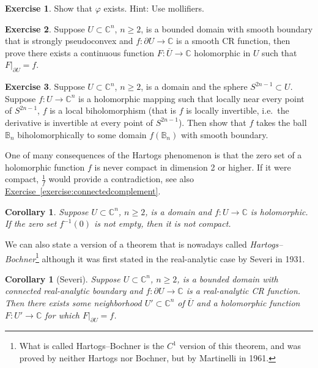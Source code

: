 \documentclass[12pt,openany]{book}
\newcommand{\C}{{\mathbb{C}}}
\newcommand{\bB}{{\mathbb{B}}}
\newcommand{\myindex}[1]{#1\index{#1}}
\theoremstyle{plain}
\newtheorem{cor}[thm]{Corollary}
\theoremstyle{remark}
\theoremstyle{definition}
\newenvironment{exbox}{%
    \def\FrameCommand{\vrule width 1pt \relax\hspace {10pt}}%
    \MakeFramed {\advance \hsize -\width \FrameRestore }%
}{%
    \endMakeFramed
}
\theoremstyle{exercise}
\newtheorem{exercise}{Exercise}[section]
\theoremstyle{example}
\newcommand{\exerciseref}[1]{\hyperref[#1]{Exercise~\ref*{#1}}}
\begin{document}
\begin{exbox}
\begin{exercise}
Show that $\varphi$ exists.  Hint: Use mollifiers.
\end{exercise}

\begin{exercise}
Suppose $U \subset \C^n$, $n \geq 2$, is a bounded domain with smooth boundary that is
strongly pseudoconvex
and $f \colon \partial U \to \C$ is a smooth CR function, then prove
there exists a continuous function $F \colon \overline{U} \to \C$
holomorphic in $U$
such that $F|_{\partial U} = f$.
\end{exercise}

\begin{exercise}
Suppose $U \subset \C^n$, $n \geq 2$, is a domain and the sphere $S^{2n-1}
\subset U$.  Suppose $f \colon U \to \C^n$ is a holomorphic mapping
such that locally near every point of $S^{2n-1}$, $f$ is a local
biholomorphism (that is $f$ is locally invertible, i.e.\ the 
derivative is invertible at every point of $S^{2n-1}$).  Then show that
$f$ takes the ball $\bB_n$ biholomorphically to some domain $f(\bB_n)$ with smooth
boundary.
\end{exercise}
\end{exbox}

One of many consequences of the Hartogs phenomenon is
that
the zero set of a holomorphic function $f$ is never compact in
dimension 2 or higher.  If it
were compact, $\frac{1}{f}$ would provide a contradiction, see also
\exerciseref{exercise:connectedcomplement}.

\begin{cor}
Suppose $U \subset \C^n$, $n \geq 2$, is a domain and $f \colon U \to \C$ is
holomorphic.  If the zero set $f^{-1}(0)$ is not empty, then it is not compact.
\end{cor}

We can also state a version of a theorem that is nowadays called
\emph{\myindex{Hartogs--Bochner}}\footnote{What is called
Hartogs--Bochner is 
the $C^1$ version of this theorem, and was proved by neither Hartogs nor
Bochner, but by Martinelli in 1961.}
although it was first stated
in the real-analytic case by
Severi in 1931.

\begin{cor}[Severi]
Suppose $U \subset \C^n$, $n \geq 2$, is a bounded domain with connected real-analytic boundary and
$f \colon \partial U \to \C$ is a real-analytic CR function.  Then
there exists some neighborhood $U' \subset \C^n$ of $\overline{U}$
and a holomorphic function $F \colon U' \to \C$ for which
$F|_{\partial U} = f$.
\end{cor}
\end{document}
